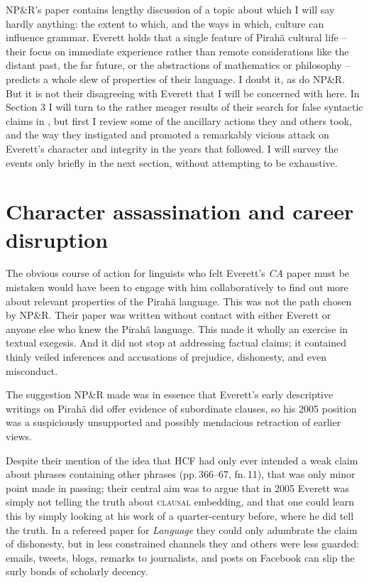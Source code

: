 \documentclass[output=paper,colorlinks,citecolor=brown
]{langscibook}
\begin{document}
NP\&R's paper \citep{NevPesRod09a} contains lengthy discussion of a
topic about which I will say hardly anything: the extent to which,
and the ways in which, culture can influence grammar. Everett holds
that a single feature of Pirah{\~a} cultural life -- their focus on
immediate experience rather than remote considerations like the distant
past, the far future, or the abstractions of mathematics or philosophy
-- predicts a whole slew of properties of their language. I doubt it,
as do NP\&R. But it is not their disagreeing with Everett that I will
be concerned with here. In Section 3 I will turn to the rather meager
results of their search for false syntactic claims in \citet{Everett05},
but first I review some of the ancillary actions they and others took,
and the way they instigated and promoted a remarkably vicious attack
on Everett's character and integrity in the years that followed.
I will survey the events only briefly in the next section, without
attempting to be exhaustive.

\section{Character assassination and career disruption}\label{war}

The obvious course of action for linguists who felt Everett's
\textit{CA} paper must be mistaken would have been to engage with
him collaboratively to find out more about relevant properties of the
Pirah{\~a} language. This was not the path chosen by NP\&R. Their
paper was written without contact with either Everett or anyone else
who knew the Pirah{\~a} language. This made it wholly an exercise in
textual exegesis. And it did not stop at addressing factual claims;
it contained thinly veiled inferences and accusations of prejudice,
dishonesty, and even misconduct.

The suggestion NP\&R made was in essence that Everett's early
descriptive writings on Pirah{\~a} did offer evidence of subordinate
clauses, so his 2005 position was a suspiciously unsupported and
possibly mendacious retraction of earlier views.

Despite their mention of the idea that HCF had only ever intended a
weak claim about phrases containing other phrases (pp.\,366--67,
fn.\,11), that was only minor point made in passing; their central
aim was to argue that in 2005 Everett was simply not telling the truth
about \textsc{clausal} embedding, and that one could learn this by
simply looking at his work of a quarter-century before, where he did
tell the truth. In a refereed paper for \textit{Language} they could
only adumbrate the claim of dishonesty, but in less constrained
channels they and others were less guarded: emails, tweets, blogs,
remarks to journalists, and posts on Facebook can slip the surly bonds
of scholarly decency.
\end{document}
